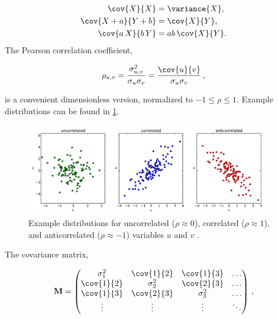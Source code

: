 \begin{subequations}\label{eq:stats:covar_relations}
\begin{align}
\cov{X}{X} &= \variance{X}, \label{eq:stats:covar_relations:var} \\
\cov{X + a}{Y + b} &= \cov{X}{Y}, \label{eq:stats:covar_relations:add} \\
\cov{a\,X}{b\,Y} &= ab\,\cov{X}{Y}. \label{eq:stats:covar_relations:mult}
\end{align}
\end{subequations}
The Pearson correlation coefficient,

\begin{equation}\label{eq:stats:corr}
\rho_{u,v} = \frac{\sigma_{u,v}^{2}}{\sigma_{u}\sigma_{v}} = \frac{\cov{u}{v}}{\sigma_{u}\sigma_{v}}\,,
\end{equation}

\noindent is a convenient dimensionless version, normalized to $-1 \leq \rho \leq 1$.
Example distributions can be found in \cref{fig:stats:corr_ex}.

\begin{figure}
\centering
\includegraphics[width=0.95\textwidth]{figures/stats/corr_ex}
\caption{
Example distributions for
uncorrelated ($\rho \approx 0$),
correlated ($\rho \approx 1$),
and anticorrelated ($\rho \approx -1$)
variables $u$ and $v$ \cite{DougNotes}.
}
\label{fig:stats:corr_ex}
\end{figure}

The covariance matrix,

\begin{align}
  \mathbf{M} = \begin{pmatrix}
    \sigma_1^2   & \cov{1}{2} & \cov{1}{3} & \ldots \\
    \cov{1}{2}   & \sigma_2^2 & \cov{2}{3} & \ldots \\
    \cov{1}{3}   & \cov{2}{3} & \sigma_3^2 & \ldots \\
    \vdots       & \vdots     & \vdots     & \ddots
  \end{pmatrix}\,,
\end{align}

